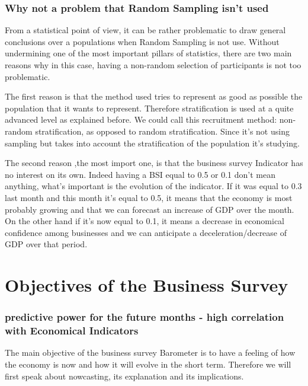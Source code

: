 \documentclass[12pt,a4paper,oneside]{book}
\begin{document}
\subsubsection{Why not a problem that Random Sampling isn't used}


From a statistical point of view, it can be rather problematic to draw general conclusions over a populations when Random Sampling is not use.
Without undermining one of the most important pillars of statistics, there are two main reasons why in this case, having a non-random selection of participants is not too problematic.

The first reason is that the method used tries to represent as good as possible the population that it wants to represent. Therefore stratification is used at a quite advanced level as explained before. 
We could call this recruitment method: non-random stratification, as opposed to random stratification. Since it's not using sampling but takes into account the stratification of the population it's studying.

The second reason ,the most import one, is that the business survey Indicator has no interest on its own. Indeed having a BSI equal to 0.5 or 0.1 don't mean anything, what's important is the evolution of the indicator. If it was equal to 0.3 last month and this month it's equal to 0.5, it means that the economy is most probably growing and that we can forecast an increase of GDP over the month. On the other hand if it's now equal to 0.1, it means a decrease in economical confidence among businesses and we can anticipate a deceleration/decrease of GDP over that period.



\section{Objectives of the Business Survey}
\label{section:Objective}

\subsubsection{predictive power for the future months - high correlation with Economical Indicators}

The main objective of the business survey Barometer is to have a feeling of how the economy is now and how it will evolve in the short term. Therefore we will first speak about nowcasting, its explanation and its implications.
\end{document}
